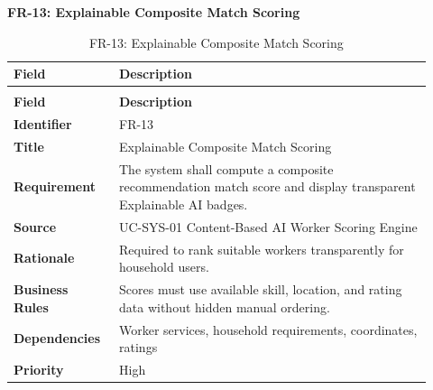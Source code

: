 \documentclass[12pt,a4paper]{article}
\begin{document}
\noindent\textbf{FR-13: Explainable Composite Match Scoring}\par
\vspace{4pt}
\begingroup\small\setlength{\tabcolsep}{4pt}\renewcommand{\arraystretch}{1.15}
\begin{longtable}{|>{\raggedright\arraybackslash}p{0.22\linewidth}|>{\raggedright\arraybackslash}p{0.70\linewidth}|}
\caption{FR-13: Explainable Composite Match Scoring}\label{tab:fr-13}\\
\hline
\textbf{Field} & \textbf{Description} \\ \hline
\endfirsthead
\multicolumn{2}{c}{Table \thetable\ Explainable Composite Match Scoring (continued)}\\
\hline
\textbf{Field} & \textbf{Description} \\ \hline
\endhead
\textbf{Identifier} & FR-13 \\ \hline
\textbf{Title} & Explainable Composite Match Scoring \\ \hline
\textbf{Requirement} & The system shall compute a composite recommendation match score and display transparent Explainable AI badges. \\ \hline
\textbf{Source} & UC-SYS-01 Content-Based AI Worker Scoring Engine \\ \hline
\textbf{Rationale} & Required to rank suitable workers transparently for household users. \\ \hline
\textbf{Business Rules} & Scores must use available skill, location, and rating data without hidden manual ordering. \\ \hline
\textbf{Dependencies} & Worker services, household requirements, coordinates, ratings \\ \hline
\textbf{Priority} & High \\ \hline
\end{longtable}
\endgroup
\end{document}
